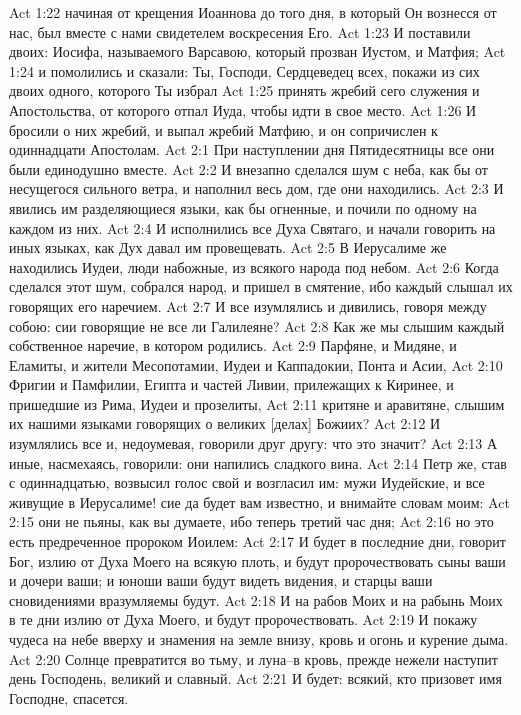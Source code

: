 Act 1:22  начиная от крещения Иоаннова до того дня, в который Он вознесся от нас, был вместе с нами свидетелем воскресения Его.
Act 1:23  И поставили двоих: Иосифа, называемого Варсавою, который прозван Иустом, и Матфия;
Act 1:24  и помолились и сказали: Ты, Господи, Сердцеведец всех, покажи из сих двоих одного, которого Ты избрал
Act 1:25  принять жребий сего служения и Апостольства, от которого отпал Иуда, чтобы идти в свое место.
Act 1:26  И бросили о них жребий, и выпал жребий Матфию, и он сопричислен к одиннадцати Апостолам.
Act 2:1  При наступлении дня Пятидесятницы все они были единодушно вместе.
Act 2:2  И внезапно сделался шум с неба, как бы от несущегося сильного ветра, и наполнил весь дом, где они находились.
Act 2:3  И явились им разделяющиеся языки, как бы огненные, и почили по одному на каждом из них.
Act 2:4  И исполнились все Духа Святаго, и начали говорить на иных языках, как Дух давал им провещевать.
Act 2:5  В Иерусалиме же находились Иудеи, люди набожные, из всякого народа под небом.
Act 2:6  Когда сделался этот шум, собрался народ, и пришел в смятение, ибо каждый слышал их говорящих его наречием.
Act 2:7  И все изумлялись и дивились, говоря между собою: сии говорящие не все ли Галилеяне?
Act 2:8  Как же мы слышим каждый собственное наречие, в котором родились.
Act 2:9  Парфяне, и Мидяне, и Еламиты, и жители Месопотамии, Иудеи и Каппадокии, Понта и Асии,
Act 2:10  Фригии и Памфилии, Египта и частей Ливии, прилежащих к Киринее, и пришедшие из Рима, Иудеи и прозелиты,
Act 2:11  критяне и аравитяне, слышим их нашими языками говорящих о великих [делах] Божиих?
Act 2:12  И изумлялись все и, недоумевая, говорили друг другу: что это значит?
Act 2:13  А иные, насмехаясь, говорили: они напились сладкого вина.
Act 2:14  Петр же, став с одиннадцатью, возвысил голос свой и возгласил им: мужи Иудейские, и все живущие в Иерусалиме! сие да будет вам известно, и внимайте словам моим:
Act 2:15  они не пьяны, как вы думаете, ибо теперь третий час дня;
Act 2:16  но это есть предреченное пророком Иоилем:
Act 2:17  И будет в последние дни, говорит Бог, излию от Духа Моего на всякую плоть, и будут пророчествовать сыны ваши и дочери ваши; и юноши ваши будут видеть видения, и старцы ваши сновидениями вразумляемы будут.
Act 2:18  И на рабов Моих и на рабынь Моих в те дни излию от Духа Моего, и будут пророчествовать.
Act 2:19  И покажу чудеса на небе вверху и знамения на земле внизу, кровь и огонь и курение дыма.
Act 2:20  Солнце превратится во тьму, и луна--в кровь, прежде нежели наступит день Господень, великий и славный.
Act 2:21  И будет: всякий, кто призовет имя Господне, спасется.
